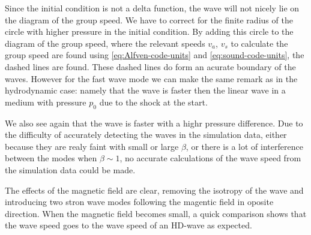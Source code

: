 Since the initial condition is not a delta function, the wave will not nicely lie on the diagram of the group speed.
We have to correct for the finite radius of the circle with higher pressure in the initial condition.
By adding this circle to the diagram of the group speed, where the relevant speeds $v_a$, $v_s$ to calculate the group speed are found using \cref{eq:Alfven-code-units} and \cref{eq:sound-code-units}, the dashed lines are found.
These dashed lines do form an acurate boundary of the waves.
However for the fast wave mode we can make the same remark as in the hydrodynamic case: namely that the wave is faster then the linear wave in a medium with pressure $p_0$ due to the shock at the start.

We also see again that the wave is faster with a highr pressure difference. 
Due to the difficulty of accurately detecting the waves in the simulation data, either because they are realy faint with small or large $\beta$, or there is a lot of interference between the modes when $\beta \sim 1$, no accurate calculations of the wave speed from the simulation data could be made.

The effects of the magnetic field are clear, removing the isotropy of the wave and introducing two stron wave modes following the magentic field in oposite direction.
When the magnetic field becomes small, a quick comparison shows that the wave speed goes to the wave speed of an HD-wave as expected.

